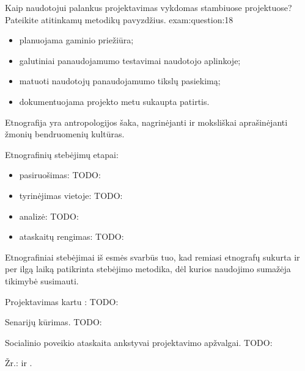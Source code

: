 \begin{question}{%
  Kaip naudotojui palankus projektavimas vykdomas stambiuose projektuose?
  Pateikite atitinkamų metodikų pavyzdžius.
  }{exam:question:18}
\begin{enumerate}
      \begin{itemize}
        \item planuojama gaminio priežiūra;
        \item galutiniai panaudojamumo testavimai naudotojo aplinkoje;
        \item matuoti naudotojų panaudojamumo tikslų pasiekimą;
        \item dokumentuojama projekto metu sukaupta patirtis.
      \end{itemize}
  \end{enumerate}

  Etnografija yra antropologijos šaka, nagrinėjanti ir moksliškai
  aprašinėjanti žmonių bendruomenių kultūras.

  Etnografinių stebėjimų etapai:
  \begin{itemize}
    \item pasiruošimas:
      TODO: \cite[52]{skaidres-7}
    \item tyrinėjimas vietoje:
      TODO: \cite[52]{skaidres-7}
    \item analizė:
      TODO: \cite[53]{skaidres-7}
    \item ataskaitų rengimas:
      TODO: \cite[53]{skaidres-7}
  \end{itemize}
  Etnografiniai stebėjimai iš esmės svarbūs tuo, kad remiasi etnografų
  sukurta ir per ilgą laiką patikrinta stebėjimo metodika, dėl kurios
  naudojimo sumažėja tikimybė susimauti.

  Projektavimas kartu :
  TODO: \cite[55--56]{skaidres-7}

  Senarijų kūrimas. TODO: \cite[57]{skaidres-7}

  Socialinio poveikio ataskaita ankstyvai projektavimo apžvalgai.
  TODO: \cite[58]{skaidres-7}

  Žr.: \cite[36--]{skaidres-7} ir \cite[165--175]{konspektas}.
\end{question}

